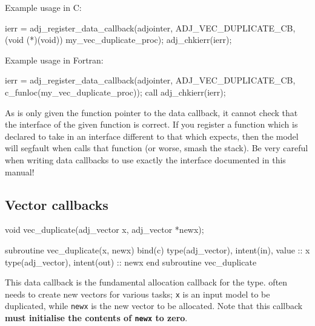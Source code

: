 Example usage in C:
\begin{framed}
\begin{minipage}{\columnwidth}
\begin{ccode}
  ierr = adj_register_data_callback(adjointer, ADJ_VEC_DUPLICATE_CB, 
                                   (void (*)(void)) my_vec_duplicate_proc);
  adj_chkierr(ierr);
\end{ccode}
\end{minipage}
\end{framed}

Example usage in Fortran:
\begin{framed}
\begin{minipage}{\columnwidth}
\begin{fortrancode}
  ierr = adj_register_data_callback(adjointer, ADJ_VEC_DUPLICATE_CB, 
                                    c_funloc(my_vec_duplicate_proc));
  call adj_chkierr(ierr);
\end{fortrancode}
\end{minipage}
\end{framed}

As \libadjoint is only given the function pointer to the data callback, it cannot check that the
interface of the given function is correct. If you register a function which is declared to take 
in an interface different to that which \libadjoint expects, then the model will segfault when
\libadjoint calls that function (or worse, smash the stack). Be very careful when writing data callbacks to use exactly
the interface documented in this manual!

\subsection{Vector callbacks} \label{sec:vector_callbacks}
\begin{framed}
\begin{minipage}{\columnwidth}
\begin{ccode}
  void vec_duplicate(adj_vector x, adj_vector *newx);
\end{ccode}
\begin{fortrancode}
  subroutine vec_duplicate(x, newx) bind(c)
    type(adj_vector), intent(in), value :: x
    type(adj_vector), intent(out) :: newx
  end subroutine vec_duplicate
\end{fortrancode}
\end{minipage}
\end{framed}
This data callback is the fundamental allocation callback for the  type. \libadjoint
often needs to create new vectors for various tasks; \texttt{x} is an
input model  to be duplicated, while \texttt{newx} is the new vector
to be allocated. Note that this callback \textbf{must initialise the contents of \texttt{newx} to zero}.

